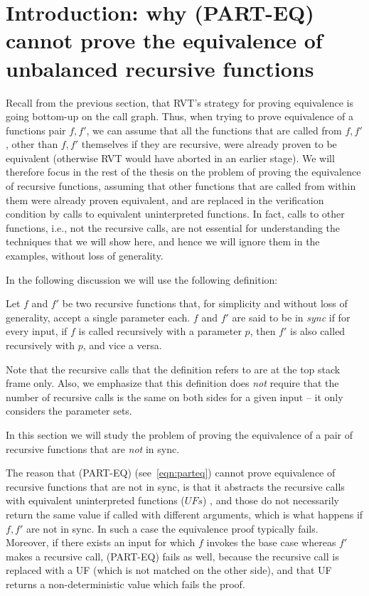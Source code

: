 \section{Introduction: why (PART-EQ) cannot prove the equivalence of unbalanced recursive functions}
Recall from the previous section, that RVT's strategy for proving equivalence is going bottom-up on the call graph. Thus, when trying to prove equivalence of a functions pair $f,f'$, we can assume that all the functions that are called from $f,f'$, other than $f,f'$ themselves if they are recursive, were already proven to be equivalent (otherwise RVT would have aborted in an earlier stage). We will therefore focus in the rest of the thesis on the problem of proving the equivalence of recursive functions, assuming that other functions that are called from within them were already proven equivalent, and are replaced in the verification condition by calls to equivalent uninterpreted functions. In fact, calls to other functions, i.e., not the recursive calls, are not essential for understanding the techniques that we will show here, and hence we will ignore them in the examples, without loss of generality. 

In the following discussion we will use the following definition:
\begin{definition}[Sync] \label{def:sync}
Let $f$ and $f'$ be two recursive functions that, for simplicity and without loss of generality, accept a single parameter each. $f$ and $f'$ are said to be in \emph{sync} if for every input, if $f$ is called recursively with a parameter $p$, then $f'$ is also called recursively with $p$, and vice a versa. 
\end{definition}
%
Note that the recursive calls that the definition refers to are at the top stack frame only.  
Also, we emphasize that this definition does \emph{not} require that the number of recursive calls is the same on both sides for a given input -- it only considers the parameter sets.

In this section we will study the problem of proving the equivalence of a pair of recursive functions that are \emph{not} in sync. 

The reason that (PART-EQ) (see~\ref{eqn:parteq}) cannot prove equivalence of recursive functions that are not in sync, is that it abstracts the recursive calls with equivalent uninterpreted functions ($UFs$) \cite{DBLP:conf/dac/GodlinS09}, and those do not necessarily return the same value if called with different arguments, which is what happens if $f,f'$ are not in sync. In such a case the equivalence proof typically fails.
Moreover, if there exists an input for which $f$ invokes the base case whereas $f'$ makes a recursive call, (PART-EQ) fails as well, because the recursive call is replaced with a UF (which is not matched on the other side), and that UF returns a non-deterministic value which fails the proof.


